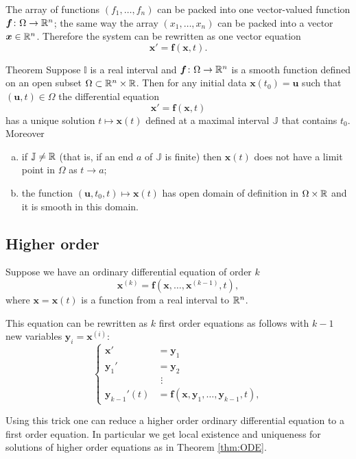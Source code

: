 The array of functions $(f_1,\dots,f_n)$ can be packed into one vector-valued function 
$\bm{f}\colon\Omega\to \mathbb{R}^n$;
the same way the array $(x_1,\dots,x_n)$ can be packed into a vector  $\bm{x}\in\mathbb{R}^n$.
Therefore the system can be rewritten as one vector equation 
\[\bm{x}'=\bm{f}(\bm{x}, t).\] 

\begin{thm}{Theorem}\label{thm:ODE}
Suppose $\mathbb{I}$ is a real interval and $\bm{f}\colon\Omega\to \mathbb{R}^n$ is a smooth function defined on an open subset $\Omega\subset \mathbb{R}^n\times \mathbb{R}$.
Then for any initial data $\bm{x}(t_0)=\bm{u}$ such that $(\bm{u},t)\in\Omega$ the differential equation 
\[\bm{x}'=\bm{f}(\bm{x},t)\]
has a unique solution $t\mapsto \bm{x}(t)$ defined at a maximal interval $\mathbb{J}$ that contains $t_0$.
Moreover
\begin{enumerate}[(a)]
\item  if $\mathbb{J}\ne \mathbb{R}$ (that is, if an end $a$ of $\mathbb{J}$ is finite) then $\bm{x}(t)$ does not have a limit point in $\Omega$ as $t\to a$;
\item  the function $(\bm{u},t_0,t)\mapsto \bm{x}(t)$ has open domain of definition in $\Omega\times \mathbb{R}$ and it is smooth in this domain.
\end{enumerate}

\end{thm}

\subsection*{Higher order}

Suppose we have an ordinary differential equation of order $k$
\[\bm{x}^{(k)}=\bm{f}(\bm{x},\dots,\bm{x}^{(k-1)},t),\]
where $\bm{x}=\bm{x}(t)$ is a function from a real interval to $\mathbb{R}^n$.

This equation can be rewritten as $k$ first order equations as follows with $k-1$ new variables $\bm{y}_i=\bm{x}^{(i)}$:
\[
\begin{cases}
\bm{x}'&=\bm{y}_1
\\
\bm{y}_1'&=\bm{y}_2
\\
&\,\,\vdots
\\
\bm{y}_{k-1}'(t)&=\bm{f}(\bm{x},\bm{y}_{1},\dots,\bm{y}_{k-1},t),
\end{cases}
\]

Using this trick one can reduce a higher order ordinary differential equation to a first order equation. 
In particular we get local existence and uniqueness for solutions of higher order equations as in Theorem \ref{thm:ODE}.



